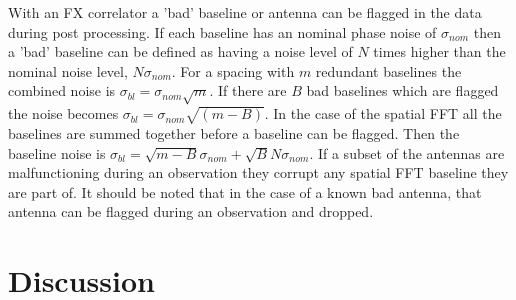 \documentclass[useAMS,macros,usenatbib,onecolumn]{mn2e}
\begin{document}
With an FX correlator a 'bad' baseline or antenna can be flagged in the data during post processing.
If each baseline has an nominal phase noise of $\sigma_{nom}$ then a 'bad' baseline can be defined as having a noise level of $N$ times higher than the nominal noise level, $N\sigma_{nom}$.
For a spacing with $m$ redundant baselines the combined noise is $\sigma_{bl}=\sigma_{nom}\sqrt{m}$.
If there are $B$ bad baselines which are flagged the noise becomes $\sigma_{bl}=\sigma_{nom}\sqrt{(m-B)}$.
In the case of the spatial FFT all the baselines are summed together before a baseline can be flagged.
Then the baseline noise is $\sigma_{bl}=\sqrt{m-B}\sigma_{nom}+\sqrt{B}N\sigma_{nom}$.
If a subset of the antennas are malfunctioning during an observation they corrupt any spatial FFT baseline they are part of.
It should be noted that in the case of a known bad antenna, that antenna can be flagged during an observation and dropped.

\section{Discussion}
\label{discussion}


{}

\end{document}
